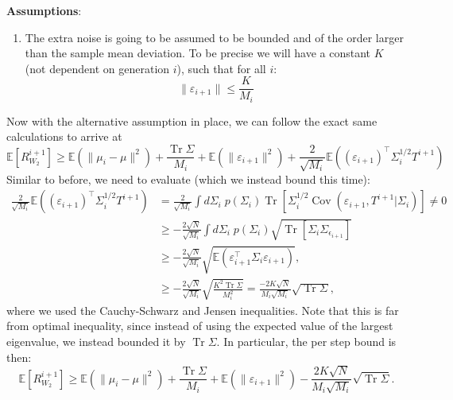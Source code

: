 \textbf{Assumptions}:
\begin{enumerate}
    \item[\textbf{3*.}] The extra noise is going to be assumed to be bounded and of the order larger than the sample mean deviation. To be precise we will have a constant $K$ (not dependent on generation $i$), such that for all $i$:
\begin{equation}
    \|\varepsilon_{i+1}\| \leq \frac{K}{M_i}
\end{equation}
\end{enumerate}
Now with the alternative assumption in place, we can follow the exact same calculations to arrive at
\begin{equation}
\label{eq:mean_risk_2_app}
\mathbb{E}\left[R^{i+1}_{W_2}\right]\geq\mathbb{E}\left(\|\mu_{i}-\mu\|^2\right)+\frac{\operatorname{Tr}\Sigma}{M_i}+\mathbb{E}\left(\|\varepsilon_{i+1}\|^2\right)+\frac{2}{\sqrt{M_i}}\mathbb{E}\left((\varepsilon_{i+1})^{\top}\Sigma^{1/2}_iT^{i+1} \right)
\end{equation}
Similar to before, we need to evaluate (which we instead bound this time):
\begin{align}
    \frac{2}{\sqrt{M_i}}\mathbb{E}\left((\varepsilon_{i+1})^{\top}\Sigma^{1/2}_iT^{i+1}\right) 
    &= \frac{2}{\sqrt{M_i}}\int d\Sigma_i\;p(\Sigma_i)\operatorname{Tr}\left[\Sigma^{1/2}_i\operatorname{Cov}(\varepsilon_{i+1},T^{i+1}|\Sigma_i)\right]\neq0\\
    &\geq -\frac{2\sqrt{N}}{\sqrt{M_i}}\int d\Sigma_i\;p(\Sigma_i)\sqrt{\operatorname{Tr}\left[\Sigma_i\Sigma_{\epsilon_{i+1}}\right]}\\
    &\geq -\frac{2\sqrt{N}}{\sqrt{M_i}}\sqrt{\mathbb{E}\left(\varepsilon_{i+1}^{\top}\Sigma_i\varepsilon_{i+1}\right)},\\
    &\geq -\frac{2\sqrt{N}}{\sqrt{M_i}}\sqrt{\frac{K^2\operatorname{Tr}\Sigma}{M_i^2}} = \frac{-2K\sqrt{N}}{M_i\sqrt{M_i}}\sqrt{\operatorname{Tr}\Sigma},
\end{align}
where we used the Cauchy-Schwarz and Jensen inequalities. Note that this is far from optimal inequality, since instead of using the expected value of the largest eigenvalue, we instead bounded it by $\operatorname{Tr}\Sigma$. 
In particular, the per step bound is then:
\begin{equation}
\label{eq:mean_risk_4_app}
\mathbb{E}\left[R^{i+1}_{W_2}\right]\geq\mathbb{E}\left(\|\mu_{i}-\mu\|^2\right)+\frac{\operatorname{Tr}\Sigma}{M_i}+\mathbb{E}\left(\|\varepsilon_{i+1}\|^2\right) - \frac{2K\sqrt{N}}{M_i\sqrt{M_i}}\sqrt{\operatorname{Tr}\Sigma}.
\end{equation}
